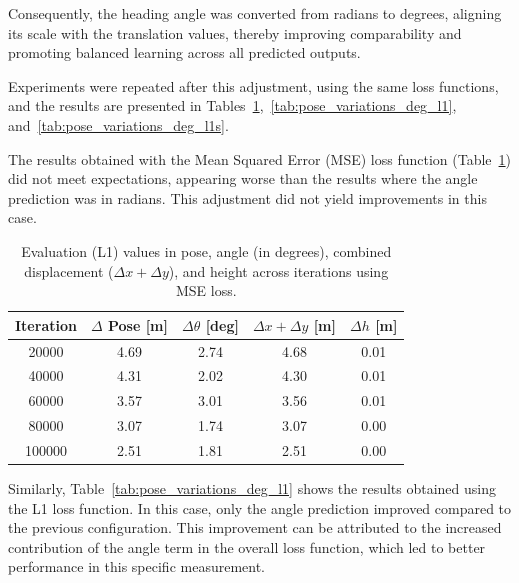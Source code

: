 Consequently, the heading angle was converted from radians to degrees, aligning its scale with the translation values, thereby improving comparability and promoting balanced learning across all predicted outputs.

Experiments were repeated after this adjustment, using the same loss functions, and the results are presented in Tables~\ref{tab:pose_variations_deg_mse},~\ref{tab:pose_variations_deg_l1}, and~\ref{tab:pose_variations_deg_l1s}.

The results obtained with the Mean Squared Error (MSE) loss function (Table~\ref{tab:pose_variations_deg_mse}) did not meet expectations, appearing worse than the results where the angle prediction was in radians. This adjustment did not yield improvements in this case.

\begin{table}[H]
    \centering
    \renewcommand{\arraystretch}{1.2} 
    \setlength{\tabcolsep}{10pt} 
    \begin{tabular}{c c c c c}
        \toprule
        \textbf{Iteration} & \textbf{$\Delta$ Pose [m]} & \textbf{$\Delta \theta$ [deg]} & \textbf{$\Delta x + \Delta y$ [m]} & \textbf{$\Delta h$ [m]} \\
        \midrule
        \num{20000}  & 4.69 & 2.74  & 4.68 & 0.01 \\
        \num{40000}  & 4.31 & 2.02  & 4.30 & 0.01 \\
        \num{60000}  & 3.57 & 3.01  & 3.56 & 0.01 \\
        \num{80000}  & 3.07 & 1.74  & 3.07 & 0.00 \\
        \num{100000} & 2.51 & 1.81  & 2.51 & 0.00 \\
        \bottomrule
    \end{tabular}
    \caption{Evaluation (L1) values in pose, angle (in degrees), combined displacement ($\Delta x + \Delta y$), and height across iterations using MSE loss.}
    \label{tab:pose_variations_deg_mse}
\end{table}

Similarly, Table~\ref{tab:pose_variations_deg_l1} shows the results obtained using the L1 loss function. In this case, only the angle prediction improved compared to the previous configuration. This improvement can be attributed to the increased contribution of the angle term in the overall loss function, which led to better performance in this specific measurement.

